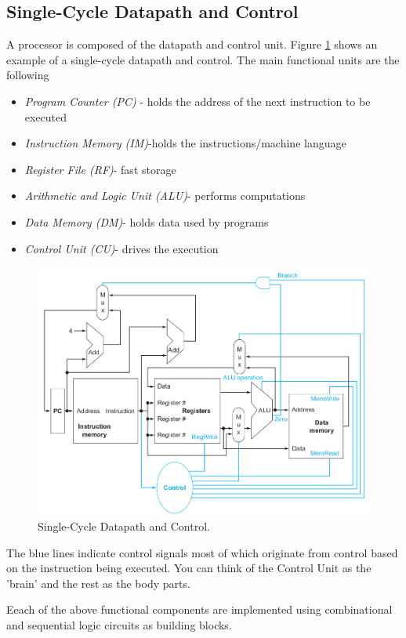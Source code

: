 \documentclass[a4paper, 11pt,oneside]{article}
\begin{document}
\subsection{Single-Cycle Datapath and Control}
A processor is composed of the datapath and control unit. Figure \ref{fig:datapath} shows an example of a 
single-cycle datapath and control. The main functional units are the following
\begin{itemize}
	\item{\textit{Program Counter (PC)} - holds the address of the next instruction to be executed}
	\item{\textit{Instruction Memory (IM)}-holds the instructions/machine language}
	\item{\textit{Register File (RF)}- fast storage}
	\item{\textit{Arithmetic and Logic Unit (ALU)}- performs computations}
	\item{\textit{Data Memory (DM)}- holds data used by programs}
	\item{\textit{Control Unit (CU)}- drives the execution }
\end{itemize}
\begin{figure}
	\includegraphics[width=\linewidth]{single-cycle-dp-control.png}
	\caption{Single-Cycle Datapath and Control.}
	\label{fig:datapath}
\end{figure}
The blue lines indicate control signals most of which originate from control based on the instruction being executed. You can think of the Control Unit as the 'brain' and the rest as the body parts.

Eeach of the above functional components are implemented using combinational and sequential logic circuits as building blocks. 
\end{document}
